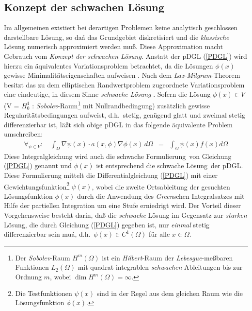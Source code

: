 \subsection{Konzept der schwachen Lösung}
\label{schwacheloesung}

Im allgemeinen existiert bei derartigen Problemen keine analytisch
geschlossen darstellbare Lösung, so daá das Grundgebiet diskretisiert
und die {\em klassische} Lösung numerisch approximiert werden muß. Diese
Approximation macht Gebrauch vom {\em Konzept der schwachen Lösung}.
Anstatt der pDGL (\ref{PDGL}) wird hierzu ein äquivalentes Variationsproblem
betrachtet, da die Lösungen $\phi(x)$ gewisse Minimalitätseigenschaften
aufweisen \cite{Bat82, Zie84}. Nach dem {\sl Lax-Milgram}-Theorem besitzt
das zu dem elliptischen Randwertproblem zugeordnete Variationsproblem eine
eindeutige, in diesem Sinne {\em schwache Lösung} \cite{Bra91}.
Sofern die Lösung
$\phi(x) \in V$ (V = $H_{0}^{1}$ : {\sl Sobolev}-Raum\footnote{Der
{\sl Sobolev}-Raum $H^{m}(\Omega)$ ist ein {\sl Hilbert}-Raum der
{\sl Lebesgue}-meßbaren Funktionen $L_{2}(\Omega)$ mit quadrat-integrablen
{\em schwachen} Ableitungen bis zur Ordnung $m$, wobei
$\dim H^{m}(\Omega) = \infty$.} mit Nullrandbedingung)
zusätzlich gewisse Regularitätsbedingungen
aufweist, d.h.\ stetig, genügend glatt und zweimal stetig differenzierbar
ist,    %
läßt sich obige pDGL in das folgende äquivalente Problem umschreiben:
\begin{eqnarray}
\label{schwach}
  \forall_{\psi \in V}: \quad \int_{\Omega} \nabla\psi(x) \cdot a(x,\phi)
  \nabla \phi(x) \, d\Omega & = & \int_{\Omega} \psi(x) f(x) d\Omega
\end{eqnarray}
Diese Integralgleichung wird auch die \glqq schwache Formulierung\grqq \,
von Gleichung (\ref{PDGL}) genannt und $\phi(x)$ ist entsprechend die
\glqq schwache Lösung\grqq \, der pDGL. Diese Formulierung mittelt die
Differentialgleichung (\ref{PDGL}) mit einer Gewichtungsfunktion\footnote{Die
Testfunktionen $\psi(x)$ sind in der Regel aus dem gleichen Raum wie die
Lösungsfunktion $\phi(x)$.} $\psi(x)$, wobei die zweite Ortsableitung der
gesuchten Lösungsfunktion $\phi(x)$ durch die Anwendung des
{\sl Green}schen Integralsatzes mit Hilfe der partiellen Integration um
eine Stufe erniedrigt wird. Der Vorteil dieser Vorgehensweise besteht
darin, daß die {\em schwache} Lösung im Gegensatz zur {\em starken} Lösung,
die durch Gleichung (\ref{PDGL}) gegeben ist, nur {\em einmal} stetig
differenzierbar sein muá, d.h.\
$\phi(x) \in C^{1}(\Omega)$ für alle $x \in \Omega$.



